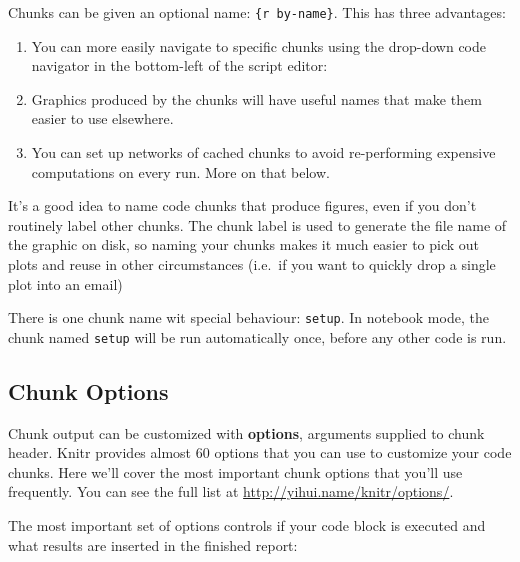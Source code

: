 \documentclass[]{book}
\providecommand{\tightlist}{%
  \setlength{\itemsep}{0pt}\setlength{\parskip}{0pt}}
\theoremstyle{definition}
\theoremstyle{definition}
\theoremstyle{definition}
\theoremstyle{remark}
\let\BeginKnitrBlock\begin \let\EndKnitrBlock\end
\begin{document}
Chunks can be given an optional name:
\texttt{\textasciigrave{}\textasciigrave{}\textasciigrave{}\{r\ by-name\}}.
This has three advantages:

\begin{enumerate}
\def\labelenumi{\arabic{enumi}.}
\tightlist
\item
  You can more easily navigate to specific chunks using the drop-down
  code navigator in the bottom-left of the script editor:
\item
  Graphics produced by the chunks will have useful names that make them
  easier to use elsewhere.
\item
  You can set up networks of cached chunks to avoid re-performing
  expensive computations on every run. More on that below.
\end{enumerate}

It's a good idea to name code chunks that produce figures, even if you
don't routinely label other chunks. The chunk label is used to generate
the file name of the graphic on disk, so naming your chunks makes it
much easier to pick out plots and reuse in other circumstances (i.e.~if
you want to quickly drop a single plot into an email)

\BeginKnitrBlock{rmdimportant}
There is one chunk name wit special behaviour: \texttt{setup}. In
notebook mode, the chunk named \texttt{setup} will be run automatically
once, before any other code is run.
\EndKnitrBlock{rmdimportant}

\hypertarget{chunk-options}{%
\subsection{Chunk Options}\label{chunk-options}}

Chunk output can be customized with \textbf{options}, arguments supplied
to chunk header. Knitr provides almost 60 options that you can use to
customize your code chunks. Here we'll cover the most important chunk
options that you'll use frequently. You can see the full list at
\url{http://yihui.name/knitr/options/}.

The most important set of options controls if your code block is
executed and what results are inserted in the finished report:
\end{document}
